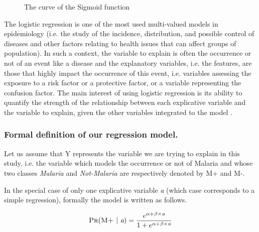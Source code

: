 \begin{figure}[ht]
\centering
{}
\caption{The curve of the Sigmoid function}\label{sigmoid_curve}
\end{figure}

The logistic regression is one of the most used multi-valued models in epidemiology \cite{Am02,Pr05} (i.e. the study of the incidence,
 distribution, and possible control of diseases and other factors relating to health issues that can affect groups of population).
In such a context, the variable to explain is often the occurrence or not of an event like a disease and the explanatory 
variables, i.e. the features, are those that highly impact the occurrence of this event, i.e. variables assessing the exposure to a 
risk factor or a protective factor, or a variable representing the confusion factor.
The main interest of using logistic regression is its ability to quantify the strength of the relationship between each explicative 
variable and the variable to explain, given the other variables integrated to the model \cite{Am02}. 

\subsubsection{Formal definition  of our regression  model.}
Let us assume that \textsc{Y} represents the variable we are trying to explain in this study, i.e. the variable which models the occurrence or not of Malaria and whose 
two classes \emph{Malaria} and \emph{Not-Malaria} are respectively denoted by \textsc{M+} and \textsc{M-}. 

In the special case of only one explicative variable \emph{a} (which case corresponds to a simple regression), formally
the model is written as follows.

\begin{equation}
\textsc{Pr}(\textsc{M+} ~|~ \emph{a}) = \frac{e^{\alpha + \beta\times \emph{a} }}{1 + e^{\alpha + \beta\times \emph{a} }}
\end{equation}

